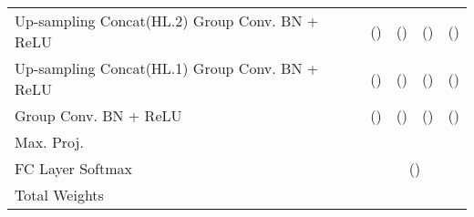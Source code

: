 \documentclass[twocolumn,final]{article}
\newcommand{\cellFormat}{\scriptsize \fontsize{7pt}{0pt}}
\newlength{\cellWidth}   \setlength{\cellWidth}{0.14\columnwidth}
\begin{document}
\begin{table}[ht!]
\begin{tabular}{p{} || p{\cellWidth} p{\cellWidth} p{\cellWidth} p{\cellWidth}}
 \scriptsize \centering Up-sampling \newline Concat(HL.2) \newline Group Conv. \newline BN + ReLU
& \cellFormat   \newline ()
& \cellFormat   \newline ()
& \cellFormat    \newline ()
& \cellFormat   \newline ()
\\

 \scriptsize \centering Up-sampling \newline Concat(HL.1) \newline Group Conv. \newline BN + ReLU
& \cellFormat   \newline ()
& \cellFormat   \newline ()
& \cellFormat   \newline ()
& \cellFormat  \newline ()
\\

 \scriptsize \centering Group Conv. \newline BN + ReLU
& \cellFormat   \newline ()
& \cellFormat   \newline ()
& \cellFormat   \newline ()
& \cellFormat   \newline ()
\\

\scriptsize \centering Max. Proj.
& \multicolumn{4}{c}{ \scriptsize  }
\\

\scriptsize \centering FC Layer \newline Softmax 
& \multicolumn{4}{c}{ \scriptsize  () }
\\\hline

\scriptsize \centering Total \newline Weights
& \multicolumn{1}{c}{ \scriptsize }
& \multicolumn{1}{c}{ \scriptsize  }
& \multicolumn{1}{c}{ \scriptsize  }
& \multicolumn{1}{c}{ \scriptsize  }

\end{tabular}
\label{tab:nucleiArchitecture} 
\end{table}
\end{document}
